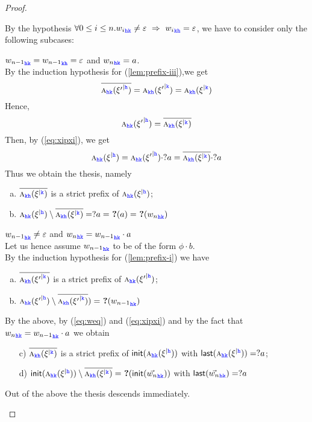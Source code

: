 \begin{proof}
\begin{description}
By the hypothesis
 $\forall 0\leq i\leq n. {w_i}_{\HH\KK}\neq \varepsilon \implies {w_i}_{\KK\HH}= \varepsilon$,
we have to consider only the following subcases:
\begin{description}
\item
      ${w_{n-1}}_{\HH\KK} = {w_{n-1}}_{\KK\HH} = \varepsilon$ and ${w_n}_{\HH\KK} = a$.\\
By the induction hypothesis for (\ref{lem:prefix-iii}),we get
$$\Dual{\symb{\HH\KK}{\restrictup{\xi'}{\HH}}}=\symb{\KK\HH}{\restrictup{\xi'}{\KK}} = \symb{\KK\HH}{\restrictup{\xi}{\KK}} $$
Hence, 
$$\symb{\HH\KK}{\restrictup{\xi'}{\HH}} = \Dual{\symb{\KK\HH}{\restrictup{\xi}{\KK}}}$$
Then, by (\ref{eq:xipxi}), we get
$$\symb{\HH\KK}{\restrictup{\xi}{\HH}} = \symb{\HH\KK}{\restrictup{\xi'}{\HH}}\cdot ?a = 
 \Dual{\symb{\KK\HH}{\restrictup{\xi}{\KK}}} \cdot ?a$$
Thus we obtain the thesis, namely
\begin{enumerate}[a)]
\item 
$\Dual{\symb{\KK\HH}{\restrictup{\xi}{\KK}}}$
 is a strict prefix of
$\symb{\HH\KK}{\restrictup{\xi}{\HH}}$;
\item
$\symb{\HH\KK}{\restrictup{\xi}{\HH}}\setminus \Dual{\symb{\KK\HH}{\restrictup{\xi}{\KK}}} = ?a = \qm(a) = \qm({{w_n}_{\HH\KK}})$
\end{enumerate}

\item
      ${w_{n-1}}_{\HH\KK}\neq\varepsilon$ and ${w_{n}}_{\HH\KK}= {w_{n-1}}_{\HH\KK}\cdot a$\\
Let us hence assume ${w_{n-1}}_{\HH\KK}$ to be of the form $\phi\cdot b$.\\
By the induction hypothesis for (\ref{lem:prefix-i}) we have
\begin{enumerate}[a)]
\item 
$\Dual{\symb{\KK\HH}{\restrictup{\xi'}{\KK}}}$
 is a strict prefix of
$\symb{\HH\KK}{\restrictup{\xi'}{\HH}}$;
\item
$\symb{\HH\KK}{\restrictup{\xi'}{\HH}}\setminus \Dual{\symb{\KK\HH}{\restrictup{\xi'}{\KK}}}) = \qm({{w_{n-1}}_{\HH\KK}})$
\end{enumerate}

     By the above, by (\ref{eq:weq}) and (\ref{eq:xipxi}) and by the fact that
 ${{w_{n}}_{\HH\KK}}= {{w_{n-1}}_{\HH\KK}}\cdot a$ we obtain
 \begin{itemize}
\item[c)]
$\Dual{\symb{\KK\HH}{\restrictup{\xi}{\KK}}}$
 is a strict prefix of
$\mathsf{init}(\symb{\HH\KK}{\restrictup{\xi}{\HH}})$ with $\mathsf{last}(\symb{\HH\KK}{\restrictup{\xi}{\HH}}) = ?a$;
\item[d)]
$\mathsf{init}(\symb{\HH\KK}{\restrictup{\xi}{\HH}})\setminus \Dual{\symb{\KK\HH}{\restrictup{\xi}{\KK}}} = \qm(\mathsf{init}({\vec{w_{n}}_{\HH\KK}}))$  with $\mathsf{last}({\vec{w_{n}}_{\HH\KK}}) = ?a $
\end{itemize}
Out of the above the thesis descends immediately.
\end{description}



\end{description}
\end{proof}
